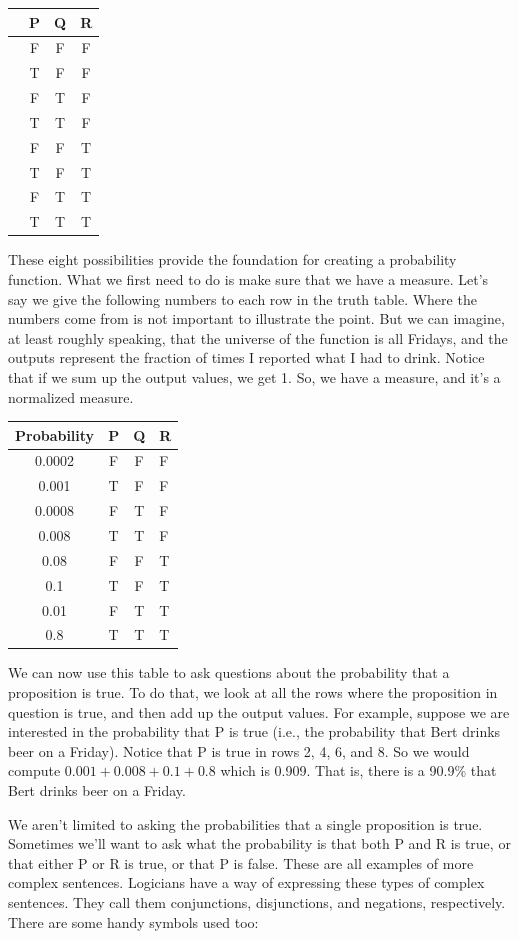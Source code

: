 \documentclass[]{tufte-book}
\begin{document}
\begin{longtable}[]{@{}lccc@{}}
\toprule
& P & Q & R\tabularnewline
\midrule
\endhead
& F & F & F\tabularnewline
& T & F & F\tabularnewline
& F & T & F\tabularnewline
& T & T & F\tabularnewline
& F & F & T\tabularnewline
& T & F & T\tabularnewline
& F & T & T\tabularnewline
& T & T & T\tabularnewline
\bottomrule
\end{longtable}

These eight possibilities provide the foundation for creating a probability function. What we first need to do is make sure that we have a measure. Let's say we give the following numbers to each row in the truth table. Where the numbers come from is not important to illustrate the point. But we can imagine, at least roughly speaking, that the universe of the function is all Fridays, and the outputs represent the fraction of times I reported what I had to drink. Notice that if we sum up the output values, we get 1. So, we have a measure, and it's a normalized measure.

\begin{longtable}[]{@{}cccl@{}}
\toprule
Probability & P & Q & R\tabularnewline
\midrule
\endhead
0.0002 & F & F & F\tabularnewline
0.001 & T & F & F\tabularnewline
0.0008 & F & T & F\tabularnewline
0.008 & T & T & F\tabularnewline
0.08 & F & F & T\tabularnewline
0.1 & T & F & T\tabularnewline
0.01 & F & T & T\tabularnewline
0.8 & T & T & T\tabularnewline
\bottomrule
\end{longtable}

We can now use this table to ask questions about the probability that a proposition is true. To do that, we look at all the rows where the proposition in question is true, and then add up the output values. For example, suppose we are interested in the probability that P is true (i.e., the probability that Bert drinks beer on a Friday). Notice that P is true in rows 2, 4, 6, and 8. So we would compute \(0.001+0.008+0.1+0.8\) which is 0.909. That is, there is a 90.9\% that Bert drinks beer on a Friday.

We aren't limited to asking the probabilities that a single proposition is true. Sometimes we'll want to ask what the probability is that both P and R is true, or that either P or R is true, or that P is false. These are all examples of more complex sentences. Logicians have a way of expressing these types of complex sentences. They call them conjunctions, disjunctions, and negations, respectively. There are some handy symbols used too:
\end{document}
